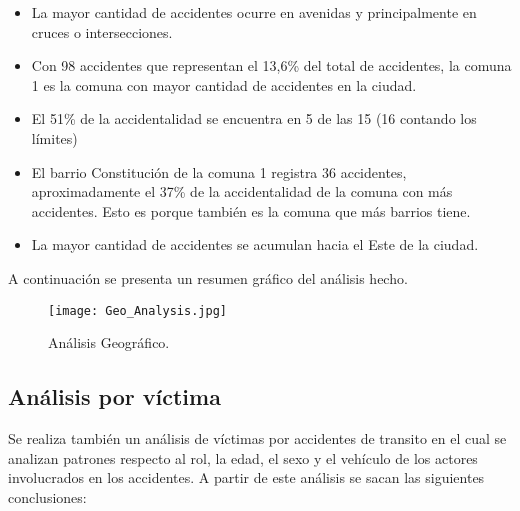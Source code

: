 \documentclass[12pt]{article}
\begin{document}
\begin{itemize}
    \item La mayor cantidad de accidentes ocurre en avenidas y principalmente en cruces o intersecciones.

    \item Con 98 accidentes que representan el 13,6\% del total de accidentes, la comuna 1 es la comuna con mayor cantidad de accidentes en la ciudad. 

    \item El 51\% de la accidentalidad se encuentra en 5 de las 15 (16 contando los límites) 
    
    \item El barrio Constitución de la comuna 1 registra 36 accidentes, aproximadamente el 37\% de la accidentalidad de la comuna con más accidentes. Esto es porque también es la comuna que más barrios tiene.

    \item La mayor cantidad de accidentes se acumulan hacia el Este de la ciudad.
\end{itemize}

A continuación se presenta un resumen gráfico del análisis hecho. 

\begin{figure}[H]
  \centering
  \texttt{[image: Geo\_Analysis.jpg]}
  \caption{Análisis Geográfico.}
  \label{fig:geo-analysis}
\end{figure}

\subsection{Análisis por víctima}
Se realiza también un análisis de víctimas por accidentes de transito en el cual se analizan patrones respecto al rol, la edad, el sexo y el vehículo de los actores involucrados en los accidentes. A partir de este análisis se sacan las siguientes conclusiones:
\end{document}
